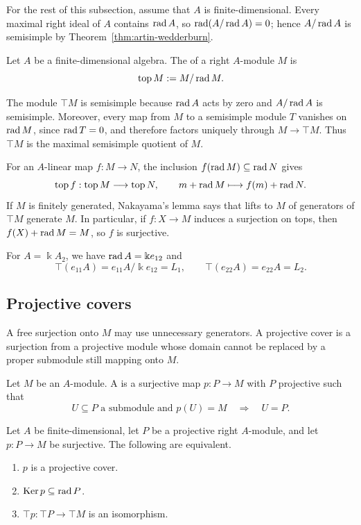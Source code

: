 For the rest of this subsection, assume that $A$ is finite-dimensional.
Every maximal right ideal of $A$ contains $\operatorname{rad}\nolimits A$, so $\operatorname{rad}\nolimits(A/\operatorname{rad}\nolimits A)=0$; hence $A/\operatorname{rad}\nolimits A$ is semisimple by Theorem~\ref{thm:artin-wedderburn}.

\begin{definition}\label{def:module-top}
Let $A$ be a finite-dimensional algebra.
The  of a right $A$-module $M$ is
\[
\operatorname{top}\nolimits M:=M/\operatorname{rad}\nolimits M.
\]
\end{definition}

The module $\top M$ is semisimple because $\operatorname{rad}\nolimits A$ acts by zero and $A/\operatorname{rad}\nolimits A$ is semisimple.
Moreover, every map from $M$ to a semisimple module $T$ vanishes on $\operatorname{rad}\nolimits M$, since $\operatorname{rad}\nolimits T=0$, and therefore factors uniquely through $M\to\top M$.
Thus $\top M$ is the maximal semisimple quotient of $M$.

For an $A$-linear map $f:M\to N$, the inclusion $f(\operatorname{rad}\nolimits M)\subseteq \operatorname{rad}\nolimits N$ gives
\[
\operatorname{top}\nolimits f:\operatorname{top}\nolimits M\longrightarrow\operatorname{top}\nolimits N,\qquad m+\operatorname{rad}\nolimits M\longmapsto f(m)+\operatorname{rad}\nolimits N.
\]
If $M$ is finitely generated, Nakayama's lemma says that lifts to $M$ of generators of $\top M$ generate $M$.
In particular, if $f:X\to M$ induces a surjection on tops, then $f(X)+\operatorname{rad}\nolimits M=M$, so $f$ is surjective.

\begin{example}
For $A=\Bbbk A_2$, we have $\operatorname{rad}\nolimits A=\Bbbk e_{12}$ and
\[
\top(e_{11}A)=e_{11}A/\Bbbk e_{12}=L_1,
\qquad \top(e_{22}A)=e_{22}A=L_2.
\]
\end{example}


\subsection{Projective covers}\label{subsec:ordinary-covers}

A free surjection onto $M$ may use unnecessary generators.
A projective cover is a surjection from a projective module whose domain cannot be replaced by a proper submodule still mapping onto $M$.

\begin{definition}\label{def:projective-cover}
Let $M$ be an $A$-module.  A  is a surjective map $p:P\to M$ with $P$ projective such that
\[
U\subseteq P\text{ a submodule and }p(U)=M
\quad\Longrightarrow\quad U=P.
\]
\end{definition}

\begin{proposition}\label{prop:cover-top}
Let $A$ be finite-dimensional, let $P$ be a projective right $A$-module, and let $p:P\to M$ be surjective.
The following are equivalent.
\begin{enumerate}
\item $p$ is a projective cover.
\item $\operatorname{Ker}\nolimits p\subseteq \operatorname{rad}\nolimits P$.
\item $\top p:\top P\to\top M$ is an isomorphism.
\end{enumerate}
\end{proposition}

